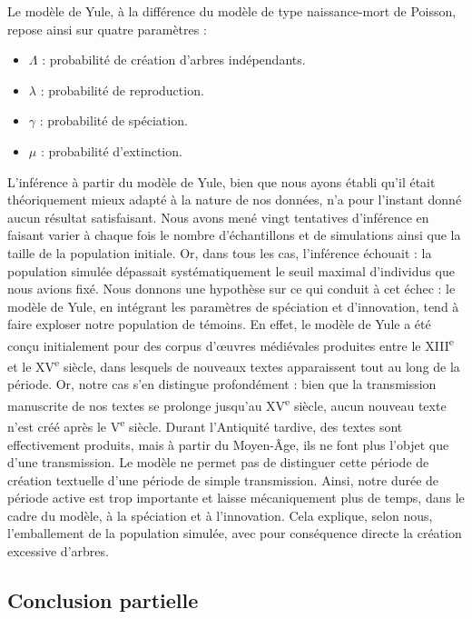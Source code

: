 \documentclass[a4paper,twoside,12pt]{book}
\begin{document}
Le modèle de Yule, à la différence du modèle de type naissance-mort de Poisson, repose ainsi sur quatre paramètres :

\begin{itemize}
	\item $\Lambda$ : probabilité de création d’arbres indépendants. 
	\item $\lambda$ : probabilité de reproduction.
	\item $\gamma$ : probabilité de spéciation.
	\item $\mu$ : probabilité d’extinction.
\end{itemize}

L’inférence à partir du modèle de Yule, bien que nous ayons établi qu’il était théoriquement mieux adapté à la nature de nos données, n’a pour l’instant donné aucun résultat satisfaisant. Nous avons mené vingt tentatives d’inférence en faisant varier à chaque fois le nombre d’échantillons et de simulations ainsi que la taille de la population initiale. Or, dans tous les cas, l’inférence échouait : la population simulée dépassait systématiquement le seuil maximal d’individus que nous avions fixé. Nous donnons une hypothèse sur ce qui conduit à cet échec : le modèle de Yule, en intégrant les paramètres de spéciation et d’innovation, tend à faire exploser notre population de témoins. En effet, le modèle de Yule a été conçu initialement pour des corpus d’œuvres médiévales produites entre le XIII\textsuperscript{e} et le XV\textsuperscript{e} siècle, dans lesquels de nouveaux textes apparaissent tout au long de la période. Or, notre cas s’en distingue profondément : bien que la transmission manuscrite de nos textes se prolonge jusqu’au XV\textsuperscript{e} siècle, aucun nouveau texte n’est créé après le V\textsuperscript{e} siècle. Durant l’Antiquité tardive, des textes sont effectivement produits, mais à partir du Moyen-Âge, ils ne font plus l’objet que d’une transmission. Le modèle ne permet pas de distinguer cette période de création textuelle d’une période de simple transmission. Ainsi, notre durée de période active 
est trop importante et laisse mécaniquement plus de temps, dans le cadre du modèle, à la spéciation et à l’innovation. Cela explique, selon nous, l’emballement de la population simulée, avec pour conséquence directe la création excessive d’arbres.


\subsection{Conclusion partielle}
\end{document}
